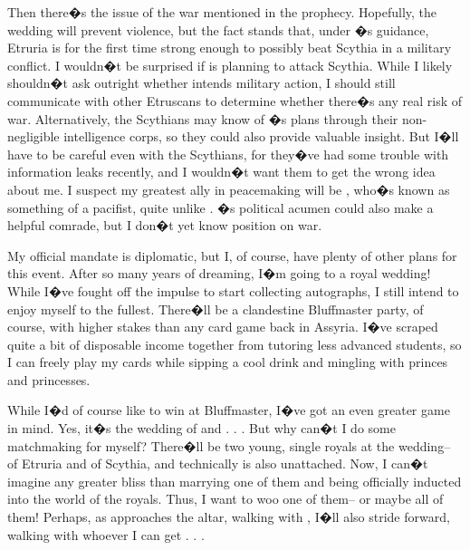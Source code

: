 \documentclass[char]{Kos}
\begin{document}
Then there�s the issue of the war mentioned in the prophecy. Hopefully, the wedding will prevent violence, but the fact stands that, under \cKingOne{\nickname}�s guidance, Etruria is for the first time strong enough to possibly beat Scythia in a military conflict. I wouldn�t be surprised if \cKingOne{\nickname} is planning to attack Scythia. While I likely shouldn�t ask \cKingOne{\them} outright whether \cKingOne{\they} intends military action, I should still communicate with other Etruscans to determine whether there�s any real risk of war. Alternatively, the Scythians may know of \cKingOne{\nickname}�s plans through their non-negligible intelligence corps, so they could also provide valuable insight. But I�ll have to be careful even with the Scythians, for they�ve had some trouble with information leaks recently, and I wouldn�t want them to get the wrong idea about me. I suspect my greatest ally in peacemaking will be \cGroom{\Prince} \cGroom{\nickname}, who�s known as something of a pacifist, quite unlike \cGroom{\their} \cKingOne{\parent}. \cBride{\nickname}�s political acumen could also make \cBride{\them} a helpful comrade, but I don�t yet know \cBride{\their} position on war.

My official mandate is diplomatic, but I, of course, have plenty of other plans for this event. After so many years of dreaming, I�m going to a royal wedding! While I�ve fought off the impulse to start collecting autographs, I still intend to enjoy myself to the fullest. There�ll be a clandestine Bluffmaster party, of course, with higher stakes than any card game back in Assyria. I�ve scraped quite a bit of disposable income together from tutoring less advanced students, so I can freely play my cards while sipping a cool drink and mingling with princes and princesses.

While I�d of course like to win at Bluffmaster, I�ve got an even greater game in mind. Yes, it�s the wedding of \cBride{\nickname} and \cGroom{\nickname} . . . But why can�t I do some matchmaking for myself? There�ll be two young, single royals at the wedding-- \cPoet{\nickname} of Etruria and \cWard{\nickname} of Scythia, and technically \cKingOne{\nickname} is also unattached. Now, I can�t imagine any greater bliss than marrying one of them and being officially inducted into the world of the royals. Thus, I want to woo one of them-- or maybe all of them! Perhaps, as \cBride{\nickname} approaches the altar, walking with \cGroom{\nickname}, I�ll also stride forward, walking with whoever I can get . . .
\end{document}

